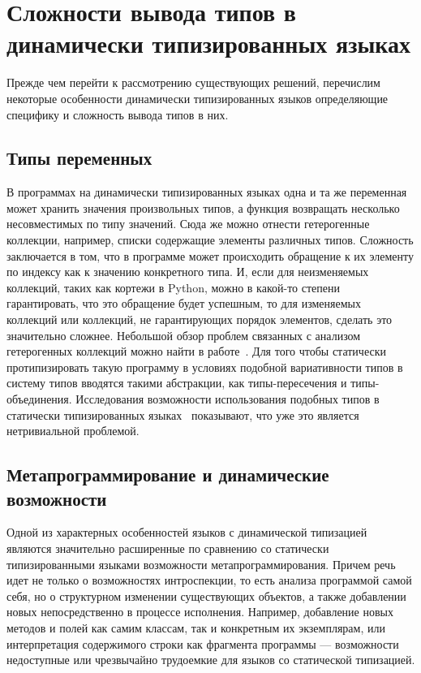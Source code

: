 
\section{Сложности вывода типов в динамически типизированных языках}
\label{sec:difficulties}

Прежде чем перейти к рассмотрению существующих решений, перечислим некоторые
особенности динамически типизированных языков определяющие специфику и сложность
вывода типов в них.

\subsection{Типы переменных}

В программах на динамически типизированных языках одна и та же переменная может
хранить значения произвольных типов, а функция возвращать несколько
несовместимых по типу значений. Сюда же можно отнести гетерогенные коллекции,
например, списки содержащие элементы различных типов. Сложность заключается в
том, что в программе может происходить обращение к их элементу по индексу как к
значению конкретного типа. И, если для неизменяемых коллекций, таких как кортежи
в Python, можно в какой-то степени гарантировать, что это обращение будет
успешным, то для изменяемых коллекций или коллекций, не гарантирующих порядок
элементов, сделать это значительно сложнее. Небольшой обзор проблем связанных с
анализом гетерогенных коллекций можно найти в работе~\cite[]{Salib2004}. 
Для того чтобы статически протипизировать такую программу в условиях подобной
вариативности типов в систему типов вводятся такими абстракции, как
типы-пересечения и типы-объединения. Исследования возможности использования
подобных типов в статически типизированных
языках~\cite[]{Igarashi2006,Ortin2011:union}  показывают, что уже это является
нетривиальной проблемой.

\subsection{Метапрограммирование и динамические возможности}

Одной из характерных особенностей языков с динамической типизацией являются
значительно расширенные по сравнению со статически типизированными языками
возможности метапрограммирования. Причем речь идет не только о возможностях
интроспекции, то есть анализа программой самой себя, но о структурном изменении
существующих объектов, а также добавлении новых непосредственно в процессе
исполнения. Например, добавление новых методов и полей как самим классам, так и
конкретным их экземплярам, или интерпретация содержимого строки как фрагмента
программы --- возможности недоступные или чрезвычайно трудоемкие для языков со
статической типизацией.

